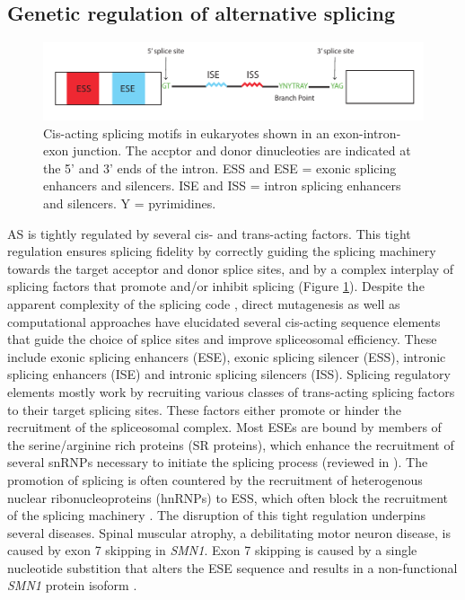 \subsection{Genetic regulation of alternative splicing}
\begin{figure}[H]
    \centering
    \includegraphics[width=\textwidth]{splicing_motifs}
    \caption{Cis-acting splicing motifs in eukaryotes shown in an exon-intron-exon junction. The accptor and donor dinucleoties are indicated at the 5' and 3' ends of the intron. ESS and ESE = exonic splicing enhancers and silencers. ISE and ISS = intron splicing enhancers and silencers. Y = pyrimidines.}
    \label{fig:splicing_motifs}   
  \end{figure}
AS is tightly regulated by several cis- and trans-acting factors. This tight regulation ensures splicing fidelity by correctly guiding the splicing machinery towards the target acceptor and donor splice sites, and by a complex interplay of splicing factors that promote and/or inhibit splicing (Figure \ref{fig:splicing_motifs}). Despite the apparent complexity of the splicing code \cite{Jaganathan2019-ah}, direct mutagenesis as well as computational approaches have elucidated several cis-acting sequence elements that guide the choice of splice sites and improve spliceosomal efficiency. These include exonic splicing enhancers (ESE), exonic splicing silencer (ESS), intronic splicing enhancers (ISE) and intronic splicing silencers (ISS). Splicing regulatory elements mostly work by recruiting various classes of trans-acting splicing factors to their target splicing sites. These factors either promote or hinder the recruitment of the spliceosomal complex. Most ESEs are bound by members of the serine/arginine rich proteins (SR proteins), which enhance the recruitment of several snRNPs necessary to initiate the splicing process (reviewed in \cite{Shepard2009-os}). The promotion of splicing is often countered by the recruitment of heterogenous nuclear ribonucleoproteins (hnRNPs) to ESS, which often block the recruitment of the splicing machinery \cite{Geuens2016-yz}. The disruption of this tight regulation underpins several diseases. Spinal muscular atrophy, a debilitating motor neuron disease, is caused by exon 7 skipping in \textit{SMN1}. Exon 7 skipping is caused by a single nucleotide substition that alters the ESE sequence and results in a non-functional \textit{SMN1} protein isoform \cite{Monani1999-vf}.\\

